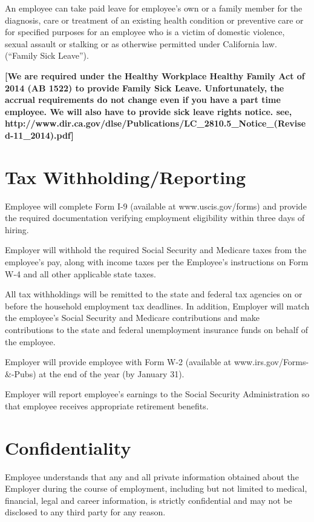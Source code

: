 \documentclass[]{article}
\begin{document}
An employee can take paid leave for employee's own or a family member for the diagnosis, care or treatment of an existing health condition or preventive care or for specified purposes for an employee who is a victim of domestic violence, sexual assault or stalking or as otherwise permitted under California law. (``Family Sick Leave'').

\textbf{{[}We are required under the Healthy Workplace Healthy Family
Act of 2014 (AB 1522) to provide Family Sick Leave. Unfortunately, the
accrual requirements do not change even if you have a part time
employee. We will also have to provide sick leave rights notice. see,
http://www.dir.ca.gov/dlse/Publications/LC\_2810.5\_Notice\_(Revised-11\_2014).pdf{]}}

\section{Tax Withholding/Reporting}

Employee will complete Form I-9 (available at www.uscis.gov/forms) and provide the required documentation verifying employment eligibility within three days of hiring.

Employer will withhold the required Social Security and Medicare taxes from the employee's pay, along with income taxes per the Employee's instructions on Form W-4 and all other applicable state taxes.

All tax withholdings will be remitted to the state and federal tax agencies on or before the household employment tax deadlines. In addition, Employer will match the employee's Social Security and Medicare contributions and make contributions to the state and federal unemployment insurance funds on behalf of the employee.

Employer will provide employee with Form W-2 (available at www.irs.gov/Forms-\&-Pubs) at the end of the year (by January 31).

Employer will report employee's earnings to the Social Security Administration so that employee receives appropriate retirement
benefits.

\section{Confidentiality}

Employee understands that any and all private information obtained about the Employer during the course of employment, including but not limited to medical, financial, legal and career information, is strictly confidential and may not be disclosed to any third party for any reason.  
\end{document}
